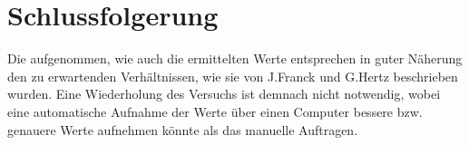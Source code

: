 \section{Schlussfolgerung}
	
	Die aufgenommen, wie auch die ermittelten Werte entsprechen in guter Näherung den zu erwartenden Verhältnissen, wie sie von J.Franck und G.Hertz beschrieben wurden.
	Eine Wiederholung des Versuchs ist demnach nicht notwendig, wobei eine automatische Aufnahme der Werte über einen Computer bessere bzw. genauere Werte aufnehmen könnte als das manuelle Auftragen. 
	










